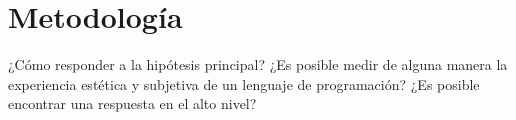 \section*{Metodología}

¿Cómo responder a la hipótesis principal? ¿Es posible medir de alguna manera la experiencia estética y subjetiva de un lenguaje de programación? ¿Es posible encontrar una respuesta en el alto nivel? 
